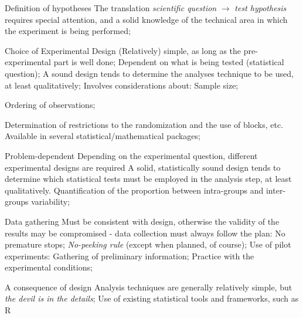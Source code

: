 
\begin{frame}{Definition of hypotheses}
The translation \textit{scientific question} $\rightarrow$ \textit{test hypothesis} requires special attention, and a solid knowledge of the technical area in which the experiment is being performed;
\end{frame}


\begin{frame}{Choice of Experimental Design}
\bitems (Relatively) simple, as long as the pre-experimental part is well done;
	\spitem Dependent on what is being tested (statistical question);
	\spitem A sound design tends to determine the analyses technique to be used, at least  qualitatively;
	\spitem Involves considerations about:
	\bitems Sample size;
		\item Ordering of observations;
		\item Determination of restrictions to the randomization and the use of blocks, etc.
	\eitem
	\spitem Available in several statistical/mathematical packages;
\eitem
\end{frame}

\begin{frame}{Problem-dependent}
\bitems Depending on the experimental question, different experimental designs are required
	\spitem A solid, statistically sound design tends to determine which statistical tests must be employed in the analysis step, at least qualitatively.
	\spitem Quantification of the proportion between intra-groups and inter-groups variability;
\eitem
\end{frame}

\begin{frame}{Data gathering}
\bitems Must be consistent with design, otherwise the validity of the results may be compromised - data collection must always follow the plan:
	\bitems No premature stops;	
		\spitem\textit{No-peeking rule} (except when planned, of course);
	\eitem
	\spitem Use of pilot experiments:
	\bitems Gathering of preliminary information;
		\spitem Practice with the experimental conditions;
	\eitem
\eitem
\end{frame}

\begin{frame}{A consequence of design}
\bitems Analysis techniques are generally relatively simple, but \textit{the devil is in the details};
	\spitem Use of existing statistical tools and frameworks, such as R
\eitem
\end{frame}

